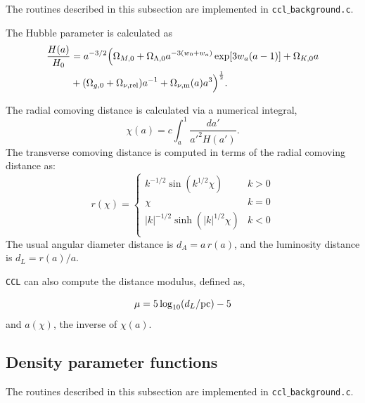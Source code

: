 \documentclass[\docopts]{\docclass}
\newcommand{\ccl}{{\tt CCL}\xspace}
\begin{document}
The routines described in this subsection are implemented in {\tt ccl$\_$background.c}.

The Hubble parameter is calculated as
%
\begin{align}\label{eq:Ha}
\frac{H(a)}{H_0} &= a^{-3/2}\Big(\Omega_{M,0}+\Omega_{\Lambda,0} a^{-3(w_0+w_a)}
    \exp[3 w_a (a-1)]+\Omega_{K,0} a \nonumber \\ &+(\Omega_{g,0} + \Omega_{\nu, {\rm rel}}) a^{-1} + \Omega_{\nu, {\rm m}}(a)a^3\Big)^{\frac{1}{2}}.
\end{align}

The radial comoving distance is calculated via a numerical integral,
\begin{equation}
 \chi(a)= c \int_a^1 \frac{da'}{a'^2 H(a')}.
\end{equation}
The transverse comoving distance is computed in terms of the radial comoving distance as:
\begin{equation}\label{eq:angdist}
 r(\chi)=\left\{\begin{array}{cc}
                 k^{-1/2}\sin(k^{1/2}\chi) & k>0\\
                 \chi & k=0\\
                 |k|^{-1/2}\sinh(|k|^{1/2}\chi) & k<0\\
                \end{array}\right.
\end{equation}
The usual angular diameter distance is $d_A=a\,r(a)$, and the luminosity distance is
$d_L=r(a)/a$.

\ccl can also compute the distance modulus, defined as,

\begin{equation}\label{eq:distmod}
    \mu = 5 \log_{10}(d_L / {\rm pc})-5
\end{equation}
and $a(\chi)$, the inverse of $\chi(a)$.


\subsection{Density parameter functions}
\label{subsec:densityparam}

The routines described in this subsection are implemented in {\tt ccl$\_$background.c}.
\end{document}
